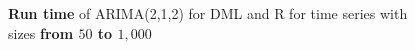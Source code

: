 \begin{figure}[ht]
	\centering
	\caption{\textbf{Run time} of ARIMA(2,1,2) for DML and R for time series with sizes \textbf{from $50$ to $1,000$} }
    \label{apx-fig:arima212-runtime-scatter-all_small}
\end{figure}